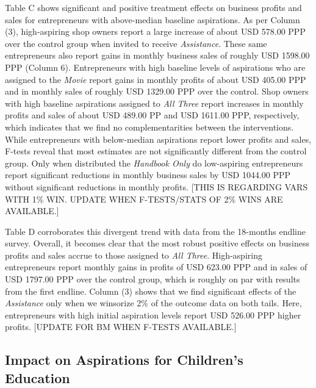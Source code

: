 \documentclass[11.5pt]{article}
\begin{document}
Table C shows significant and positive treatment effects on business profits and sales for entrepreneurs with above-median baseline aspirations. As per Column (3), high-aspiring shop owners report a large increase of about USD 578.00 PPP over the control group when invited to receive \emph{Assistance}. These same entrepreneurs also report gains in monthly business sales of roughly USD 1598.00 PPP (Column 6). Entrepreneurs with high baseline levels of aspirations who are assigned to the \emph{Movie} report gains in monthly profits of about USD 405.00 PPP and in monthly sales of roughly USD 1329.00 PPP over the control. Shop owners with high baseline aspirations assigned to \emph{All Three} report increases in monthly profits and sales of about USD 489.00 PP and USD 1611.00 PPP, respectively, which indicates that we find no complementarities between the interventions. While entrepreneurs with below-median aspirations report lower profits and sales, F-tests reveal that most estimates are not significantly different from the control group. Only when distributed the \emph{Handbook Only} do low-aspiring entrepreneurs report significant reductions in monthly business sales by USD 1044.00 PPP without significant reductions in monthly profits. [\textcolor[rgb]{1.00,0.00,0.00}{THIS IS REGARDING VARS WITH 1\% WIN. UPDATE WHEN F-TESTS/STATS OF 2\% WINS ARE AVAILABLE}.]

Table D corroborates this divergent trend with data from the 18-months endline survey. Overall, it becomes clear that the most robust positive effects on business profits and sales accrue to those assigned to \emph{All Three}. High-aspiring entrepreneurs report monthly gains in profits of USD 623.00 PPP and in sales of USD 1797.00 PPP over the control group, which is roughly on par with results from the first endline. Column (3) shows that we find significant effects of the \emph{Assistance} only when we winsorize 2\% of the outcome data on both tails. Here, entrepreneurs with high initial aspiration levels report USD 526.00 PPP higher profits. [\textcolor[rgb]{1.00,0.00,0.00}{UPDATE FOR BM WHEN F-TESTS AVAILABLE}.]


\subsection{Impact on Aspirations for Children's Education}
\end{document}
